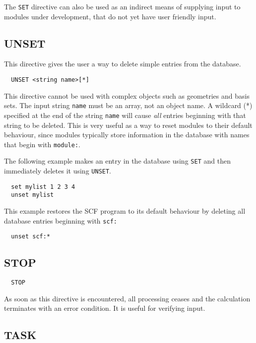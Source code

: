 The \verb+SET+ directive can also be used as an indirect means of
supplying input to modules under development, that do not yet have
user friendly input.

\subsection{UNSET}
\label{sec:unset}

This directive gives the user a way to delete simple entries from the
database. 

\begin{verbatim}
  UNSET <string name>[*]
\end{verbatim}

This directive cannot be used with complex objects such as geometries
and basis sets.  The input string \verb+name+ must be an array, not an
object name.  A wildcard (*) specified at the end of the string
\verb+name+ will cause {\em all} entries beginning with that string to
be deleted.  This is very useful as a way to reset modules to their
default behaviour, since modules typically store information in the
database with names that begin with \verb+module:+.

The following example makes an entry in the database using \verb+SET+
and then immediately deletes it using \verb+UNSET+.

\begin{verbatim}
  set mylist 1 2 3 4
  unset mylist
\end{verbatim}

This example restores the SCF program to its default behaviour by
deleting all database entries beginning with \verb+scf:+

\begin{verbatim}
  unset scf:*
\end{verbatim}

\subsection{STOP}

\begin{verbatim}
  STOP
\end{verbatim}

As soon as this directive is encountered, all processing ceases and
the calculation terminates with an error condition.  It is useful for
verifying input.

\subsection{TASK}
\label{sec:task}

